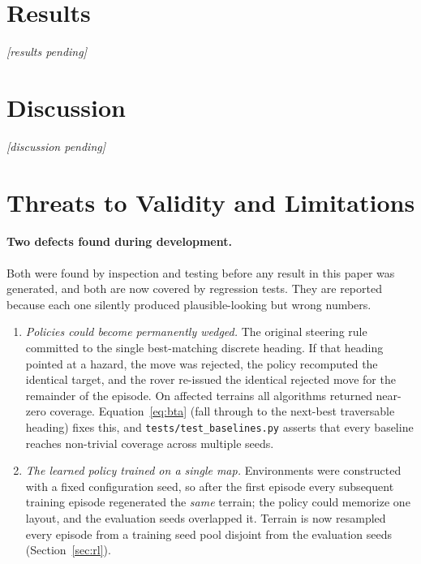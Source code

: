\documentclass[11pt]{article}
\begin{document}
\section{Results}
\label{sec:results}

\textit{[results pending]}

\section{Discussion}

\textit{[discussion pending]}

\section{Threats to Validity and Limitations}
\label{sec:threats}

\paragraph{Two defects found during development.}
Both were found by inspection and testing before any result in this paper was
generated, and both are now covered by regression tests. They are reported
because each one silently produced plausible-looking but wrong numbers.
\begin{enumerate}
  \item \emph{Policies could become permanently wedged.} The original steering
        rule committed to the single best-matching discrete heading. If that
        heading pointed at a hazard, the move was rejected, the policy
        recomputed the identical target, and the rover re-issued the identical
        rejected move for the remainder of the episode. On affected terrains all
        algorithms returned near-zero coverage. Equation~\eqref{eq:bta} (fall
        through to the next-best traversable heading) fixes this, and
        \texttt{tests/test\_baselines.py} asserts that every baseline reaches
        non-trivial coverage across multiple seeds.
  \item \emph{The learned policy trained on a single map.} Environments were
        constructed with a fixed configuration seed, so after the first episode
        every subsequent training episode regenerated the \emph{same} terrain;
        the policy could memorize one layout, and the evaluation seeds
        overlapped it. Terrain is now resampled every episode from a training
        seed pool disjoint from the evaluation seeds (Section~\ref{sec:rl}).
\end{enumerate}
\end{document}
